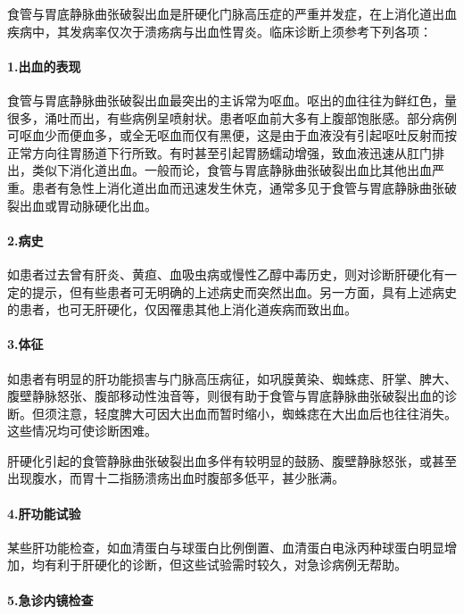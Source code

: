 食管与胃底静脉曲张破裂出血是肝硬化门脉高压症的严重并发症，在上消化道出血疾病中，其发病率仅次于溃疡病与出血性胃炎。临床诊断上须参考下列各项：

\paragraph{1.出血的表现}

食管与胃底静脉曲张破裂出血最突出的主诉常为呕血。呕出的血往往为鲜红色，量很多，涌吐而出，有些病例呈喷射状。患者呕血前大多有上腹部饱胀感。部分病例可呕血少而便血多，或全无呕血而仅有黑便，这是由于血液没有引起呕吐反射而按正常方向往胃肠道下行所致。有时甚至引起胃肠蠕动增强，致血液迅速从肛门排出，类似下消化道出血。一般而论，食管与胃底静脉曲张破裂出血比其他出血严重。患者有急性上消化道出血而迅速发生休克，通常多见于食管与胃底静脉曲张破裂出血或胃动脉硬化出血。

\paragraph{2.病史}

如患者过去曾有肝炎、黄疸、血吸虫病或慢性乙醇中毒历史，则对诊断肝硬化有一定的提示，但有些患者可无明确的上述病史而突然出血。另一方面，具有上述病史的患者，也可无肝硬化，仅因罹患其他上消化道疾病而致出血。

\paragraph{3.体征}

如患者有明显的肝功能损害与门脉高压病征，如巩膜黄染、蜘蛛痣、肝掌、脾大、腹壁静脉怒张、腹部移动性浊音等，则很有助于食管与胃底静脉曲张破裂出血的诊断。但须注意，轻度脾大可因大出血而暂时缩小，蜘蛛痣在大出血后也往往消失。这些情况均可使诊断困难。

肝硬化引起的食管静脉曲张破裂出血多伴有较明显的鼓肠、腹壁静脉怒张，或甚至出现腹水，而胃十二指肠溃疡出血时腹部多低平，甚少胀满。

\paragraph{4.肝功能试验}

某些肝功能检查，如血清蛋白与球蛋白比例倒置、血清蛋白电泳丙种球蛋白明显增加，均有利于肝硬化的诊断，但这些试验需时较久，对急诊病例无帮助。

\paragraph{5.急诊内镜检查}

